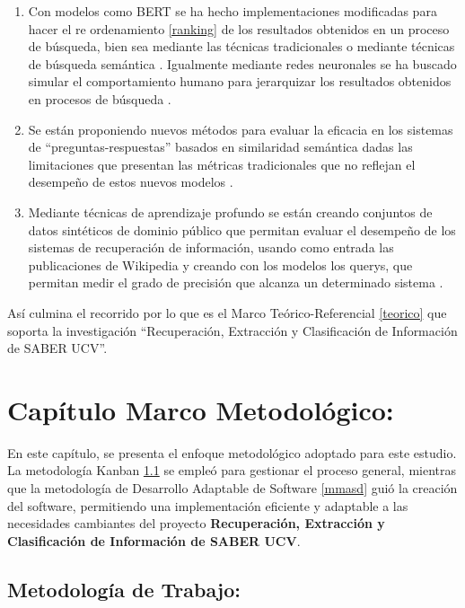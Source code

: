 \documentclass[
  10,
  openany]{book}
\begin{document}
\begin{enumerate}
\def\labelenumi{\arabic{enumi}.}
\item
  Con modelos como BERT se ha hecho implementaciones modificadas para hacer el re ordenamiento \ref{ranking} de los resultados obtenidos en un proceso de búsqueda, bien sea mediante las técnicas tradicionales o mediante técnicas de búsqueda semántica\citep{nogueira2019} . Igualmente mediante redes neuronales se ha buscado simular el comportamiento humano para jerarquizar los resultados obtenidos en procesos de búsqueda \citep{pang2017}.
\item
  Se están proponiendo nuevos métodos para evaluar la eficacia en los sistemas de ``preguntas-respuestas'' basados en similaridad semántica dadas las limitaciones que presentan las métricas tradicionales que no reflejan el desempeño de estos nuevos modelos \citep{risch2021}.
\item
  Mediante técnicas de aprendizaje profundo se están creando conjuntos de datos sintéticos de dominio público que permitan evaluar el desempeño de los sistemas de recuperación de información, usando como entrada las publicaciones de Wikipedia y creando con los modelos los querys, que permitan medir el grado de precisión que alcanza un determinado sistema \citep{frej-etal-2020-wikir}.
\end{enumerate}

Así culmina el recorrido por lo que es el Marco Teórico-Referencial \ref{teorico} que soporta la investigación ``Recuperación, Extracción y Clasificación de Información de SABER UCV''.

\hypertarget{mm}{%
\chapter{Capítulo Marco Metodológico:}\label{mm}}

En este capítulo, se presenta el enfoque metodológico adoptado para este estudio. La metodología Kanban \ref{mmmetodologia} se empleó para gestionar el proceso general, mientras que la metodología de Desarrollo Adaptable de Software \ref{mmasd} guió la creación del software, permitiendo una implementación eficiente y adaptable a las necesidades cambiantes del proyecto \textbf{Recuperación, Extracción y Clasificación de Información de SABER UCV}.

\hypertarget{mmmetodologia}{%
\section{Metodología de Trabajo:}\label{mmmetodologia}}
\end{document}
